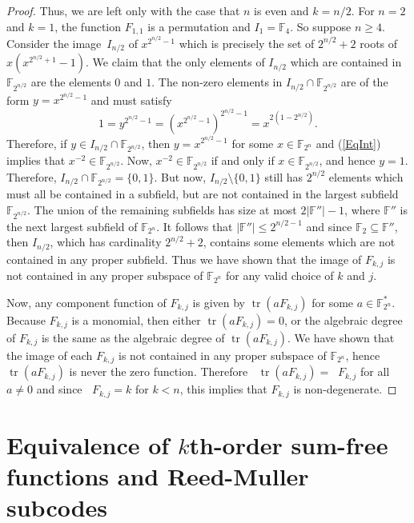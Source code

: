 \documentclass[12pt]{article}
\theoremstyle{definition}
\newcommand{\F}{\mathbb F}
\DeclareMathOperator{\degalg}{\deg_{{alg}}}
\DeclareMathOperator{\tr}{tr}
\begin{document}
\begin{proof}
    Thus, we are left only with the case that $n$ is even and $k = n/2$. For $n=2$ and $k=1$, the function $F_{1,1}$ is a permutation and $I_1 = \F_4$. So suppose $n \ge 4$. Consider the image~$I_{n/2}$ of $x^{2^{n/2}-1}$ which is precisely the set of $2^{n/2} + 2$ roots of $x(x^{2^{n/2} + 1} - 1)$. We claim that the only elements of $I_{n/2}$ which are contained in $\F_{2^{n/2}}$ are the elements $0$ and $1$. The non-zero elements in $I_{n/2}\cap \F_{2^{n/2}}$ are of the form $y = x^{2^{n/2} - 1}$ and must satisfy
    \begin{equation}\label{EqInt}
    1 = y^{2^{n/2} - 1} = \left( x^{2^{n/2}-1}\right)^{2^{n/2}-1} = x^{2(1 - 2^{n/2})}.      
    \end{equation} 
    Therefore, if $y \in I_{n/2}\cap\F_{2^{n/2}}$, then $y = x^{2^{n/2} - 1}$ for some $x \in \F_{2^n}$ and (\ref{EqInt}) implies that $x^{-2} \in \F_{2^{n/2}}$. Now, $x^{-2} \in \F_{2^{n/2}}$ if and only if $x \in \F_{2^{n/2}}$, and hence $y = 1$. Therefore, $I_{n/2}\cap \F_{2^{n/2}} = \{0, 1\}$.
     But now, $I_{n/2}\setminus\{ 0, 1\}$ still has $2^{n/2}$ elements which must all be contained in a subfield, but are not contained in the largest subfield $\F_{2^{n/2}}$. The union of the remaining subfields has size at most $2|\F''| - 1$, where $\F''$ is the next largest subfield of $\F_{2^n}$. It follows that $|\F''| \leq 2^{n/2 - 1}$ and since $\F_2 \subseteq \F''$, then $I_{n/2}$, which has cardinality $2^{n/2} + 2$,
     contains some elements which are not contained in any proper subfield. Thus we have shown that the image of $F_{k,j}$ is not contained in any proper subspace of $\F_{2^n}$ for any valid choice of $k$ and $j$.

     Now, any component function of $F_{k, j}$ is given by $\tr(aF_{k, j})$ for some $a \in \F_{2^n}^*$. Because $F_{k, j}$ is a monomial, then either $\tr(aF_{k, j}) = 0$, or the algebraic degree of $F_{k, j}$ is the same as the algebraic degree of $\tr(aF_{k, j})$. We have shown that the image of each $F_{k, j}$ is not contained in any proper subspace of $\F_{2^n}$, hence $\tr(aF_{k, j})$ is never the zero function. Therefore $\degalg \tr(aF_{k, j}) = \degalg F_{k, j}$ for all $a \neq 0$ and since $\degalg F_{k, j}=k$ for $k<n$, this implies that $F_{k, j}$ is non-degenerate.
\end{proof}




\section{Equivalence of $k$th-order sum-free functions and Reed-Muller subcodes}
\label{sec:reed-muller}
\end{document}
